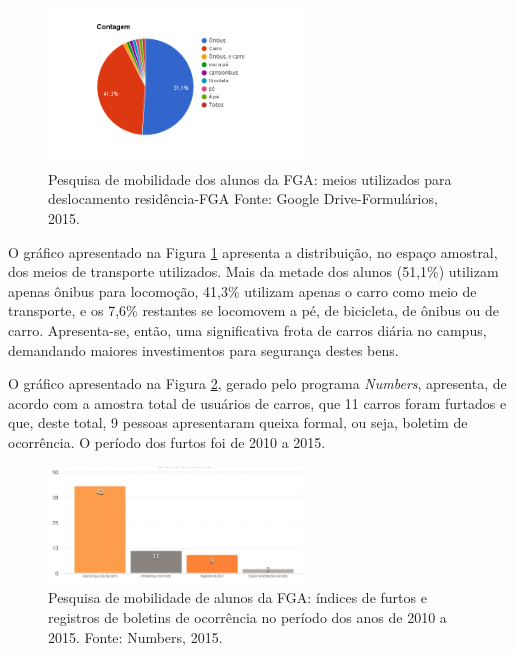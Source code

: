 \begin{figure}[H]
	\centering
	\includegraphics[width=0.6\textwidth]{figuras/resultadoquestionario}
	\caption{Pesquisa de mobilidade dos alunos da FGA: meios utilizados para deslocamento residência-FGA Fonte: Google Drive-Formulários, 2015.}
	\label{img:resultadoquestionario}
\end{figure}

O gráfico apresentado na Figura \ref{img:resultadoquestionario} apresenta a distribuição, no espaço amostral, dos meios  de transporte utilizados. Mais da metade dos alunos (51,1\%) utilizam apenas ônibus para locomoção, 41,3\% utilizam apenas o carro como meio de transporte, e os 7,6\% restantes se locomovem a pé, de bicicleta, de ônibus ou de carro. Apresenta-se, então, uma significativa frota de carros diária no campus, demandando maiores investimentos para segurança destes bens.

O gráfico apresentado na Figura \ref{img:resultadoquestionario2}, gerado pelo programa \emph{Numbers}, apresenta, de acordo com a amostra total de usuários de carros, que 11 carros foram furtados e que, deste total, 9 pessoas apresentaram queixa formal, ou seja, boletim de ocorrência. O período dos furtos foi de 2010 a 2015.

\begin{figure}[H]
	\centering
	\includegraphics[width=0.6\textwidth]{figuras/resultadoquestionario2}
	\caption{Pesquisa de mobilidade de alunos da FGA: índices de furtos e registros de boletins de ocorrência no período dos anos de 2010 a 2015. Fonte: Numbers, 2015.}
	\label{img:resultadoquestionario2}
\end{figure}

